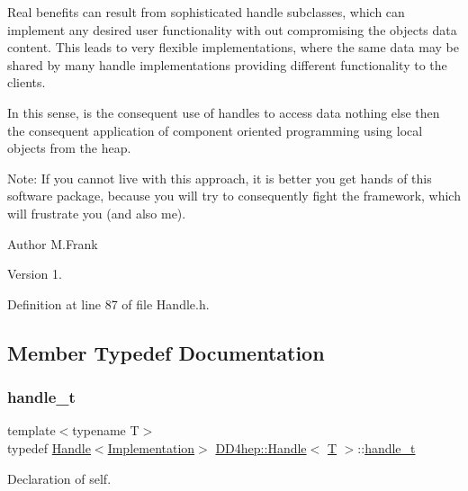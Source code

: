 Real benefits can result from sophisticated handle subclasses, which can implement any desired user functionality with out compromising the object\textquotesingle{}s data content. This leads to very flexible implementations, where the same data may be shared by many handle implementations providing different functionality to the clients.

In this sense, is the consequent use of handles to access data nothing else then the consequent application of component oriented programming using local objects from the heap.

Note\+: If you cannot live with this approach, it is better you get hands of this software package, because you will try to consequently fight the framework, which will frustrate you (and also me).

\begin{DoxyAuthor}{Author}
M.\+Frank 
\end{DoxyAuthor}
\begin{DoxyVersion}{Version}
1. 
\end{DoxyVersion}


Definition at line 87 of file Handle.\+h.



\subsection{Member Typedef Documentation}
\hypertarget{class_d_d4hep_1_1_handle_a3d9df9d5b334e984b288ffbabcacb564}{}\label{class_d_d4hep_1_1_handle_a3d9df9d5b334e984b288ffbabcacb564} 
\subsubsection{\texorpdfstring{handle\+\_\+t}{handle\_t}}
{\footnotesize\ttfamily template$<$typename T$>$ \\
typedef \hyperlink{class_d_d4hep_1_1_handle}{Handle}$<$\hyperlink{class_d_d4hep_1_1_handle_ad7ff728a25806079516b8965b9113f1a}{Implementation}$>$ \hyperlink{class_d_d4hep_1_1_handle}{D\+D4hep\+::\+Handle}$<$ \hyperlink{class_t}{T} $>$\+::\hyperlink{class_d_d4hep_1_1_handle_a3d9df9d5b334e984b288ffbabcacb564}{handle\+\_\+t}}



Declaration of \textquotesingle{}self\textquotesingle{}. 



